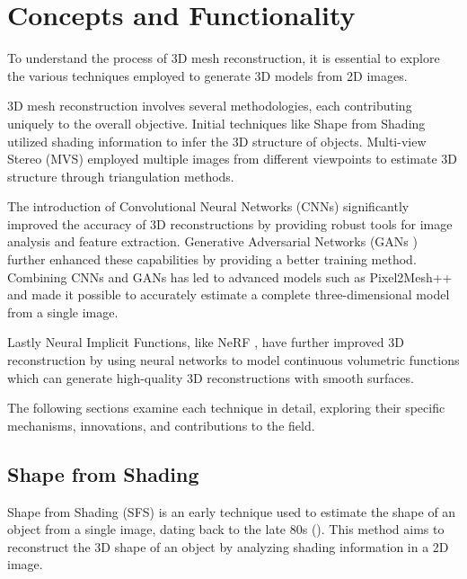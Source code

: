 

\section{Concepts and Functionality}
To understand the process of 3D mesh reconstruction, it is essential to explore the various techniques employed to generate 3D models from 2D images.

3D mesh reconstruction involves several methodologies, each contributing uniquely to the overall objective. Initial techniques like Shape from Shading \autocite{horn_shape_1989} utilized shading information to infer the 3D structure of objects. Multi-view Stereo (MVS) employed multiple images from different viewpoints to estimate 3D structure through triangulation methods.

The introduction of Convolutional Neural Networks (CNNs) significantly improved the accuracy of 3D reconstructions by providing robust tools for image analysis and feature extraction. Generative Adversarial Networks (GANs \autocite{goodfellow_generative_2014}) further enhanced these capabilities by providing a better training method.
Combining CNNs and GANs has led to advanced models such as Pixel2Mesh++ \autocite{wen_pixel2mesh_2019} and made it possible to accurately estimate a complete three-dimensional model from a single image.

Lastly Neural Implicit Functions, like NeRF \autocite{mildenhall_nerf_2021}, have further improved 3D reconstruction by using neural networks to model continuous volumetric functions which can generate high-quality 3D reconstructions with smooth surfaces.

The following sections examine each technique in detail, exploring their specific mechanisms, innovations, and contributions to the field.


\subsection{Shape from Shading}
Shape from Shading (SFS) is an early technique used to estimate the shape of an object from a single image, dating back to the late 80s (\textcite{horn_shape_1989}). This method aims to reconstruct the 3D shape of an object by analyzing shading information in a 2D image.

